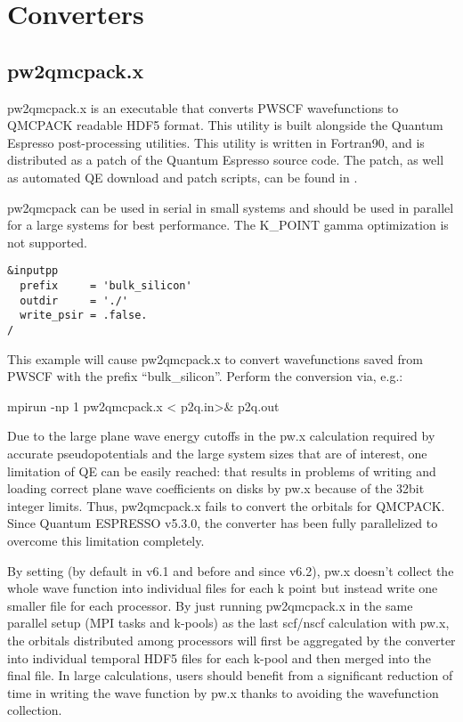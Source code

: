 \section{Converters} 
    
  \subsection{pw2qmcpack.x}
\label{sec:pw2qmcpack}
pw2qmcpack.x is an executable that converts PWSCF wavefunctions to QMCPACK readable 
HDF5 format.  This utility is built alongside the Quantum Espresso post-processing utilities.
This utility is written in Fortran90, and is distributed as a patch of the Quantum Espresso 
source code.  The patch, as well as automated QE download and patch scripts, can be found in\linebreak
{}.

pw2qmcpack can be used in serial in small systems and should be used in parallel for a large systems for best performance. The K\_POINT gamma optimization is not supported.

\begin{lstlisting}[style=ESPRESSO,caption={Sample \ishell{pw2qmcpack.x} input file \ishell{p2q.in}}]
&inputpp
  prefix     = 'bulk_silicon'
  outdir     = './'
  write_psir = .false.
/
\end{lstlisting}

This example will cause pw2qmcpack.x to convert wavefunctions saved from PWSCF with the prefix ``bulk\_silicon''. Perform the conversion via, e.g.:

\begin{shade}
mpirun -np 1 pw2qmcpack.x < p2q.in>& p2q.out
\end{shade}

Due to the large plane wave energy cutoffs in the pw.x calculation required by accurate pseudopotentials and the large system sizes that are of interest, one limitation of QE can be easily reached:
that  results in problems of writing and loading correct plane wave coefficients on disks by pw.x because of the 32bit integer limits. Thus, pw2qmcpack.x fails to convert the orbitals for QMCPACK. Since Quantum ESPRESSO v5.3.0, the converter has been fully parallelized to overcome this limitation completely.

By setting  (by default  in v6.1 and before and  since v6.2), pw.x doesn't collect the whole wave function into individual files for each k point but instead write one smaller file for each processor.
By just running pw2qmcpack.x in the same parallel setup (MPI tasks and k-pools) as the last scf/nscf calculation with pw.x,
the orbitals distributed among processors will first be aggregated by the converter into individual temporal HDF5 files for each k-pool and then merged into the final file.
In large calculations, users should benefit from a significant reduction of time in writing the wave function by pw.x thanks to avoiding the wavefunction collection.

